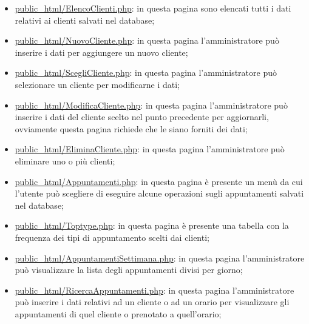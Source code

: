 {\begin{itemize}
		\item \href{http://tecnologie-web.studenti.math.unipd.it/tecweb/~pgabelli/public\_html/ElencoClienti.php}{public\_html/ElencoClienti.php}: in questa pagina sono elencati tutti i dati relativi ai clienti salvati nel database;
		\item \href{http://tecnologie-web.studenti.math.unipd.it/tecweb/~pgabelli/public\_html/NuovoCliente.php}{public\_html/NuovoCliente.php}: in questa pagina l'amministratore può inserire i dati per aggiungere un nuovo cliente;
		\item \href{http://tecnologie-web.studenti.math.unipd.it/tecweb/~pgabelli/public\_html/ScegliCliente.php}{public\_html/ScegliCliente.php}: in questa pagina l'amministratore può selezionare un cliente per modificarne i dati;
		\item \href{http://tecnologie-web.studenti.math.unipd.it/tecweb/~pgabelli/public\_html/ModificaCliente.php}{public\_html/ModificaCliente.php}: in questa pagina l'amministratore può inserire i dati del cliente scelto nel punto precedente per aggiornarli, ovviamente questa pagina richiede che le siano forniti dei dati;
		\item \href{http://tecnologie-web.studenti.math.unipd.it/tecweb/~pgabelli/public\_html/EliminaCliente.php}{public\_html/EliminaCliente.php}: in questa pagina l'amministratore può eliminare uno o più clienti;
		\item \href{http://tecnologie-web.studenti.math.unipd.it/tecweb/~pgabelli/public\_html/Appuntamenti.php}{public\_html/Appuntamenti.php}: in questa pagina è presente un menù da cui l'utente può scegliere di eseguire alcune operazioni sugli appuntamenti salvati nel database;
		\item \href{http://tecnologie-web.studenti.math.unipd.it/tecweb/~pgabelli/public\_html/Toptype.php}{public\_html/Toptype.php}: in questa pagina è presente una tabella con la frequenza dei tipi di appuntamento scelti dai clienti;
		\item \href{http://tecnologie-web.studenti.math.unipd.it/tecweb/~pgabelli/public\_html/AppuntamentiSettimana.php}{public\_html/AppuntamentiSettimana.php}: in questa pagina l'amministratore può visualizzare la lista degli appuntamenti divisi per giorno;
		\item \href{http://tecnologie-web.studenti.math.unipd.it/tecweb/~pgabelli/public\_html/RicercaAppuntamenti.php}{public\_html/RicercaAppuntamenti.php}: in questa pagina l'amministratore può inserire i dati relativi ad un cliente o ad un orario per visualizzare gli appuntamenti di quel cliente o prenotato a quell'orario;

\end{itemize}}
